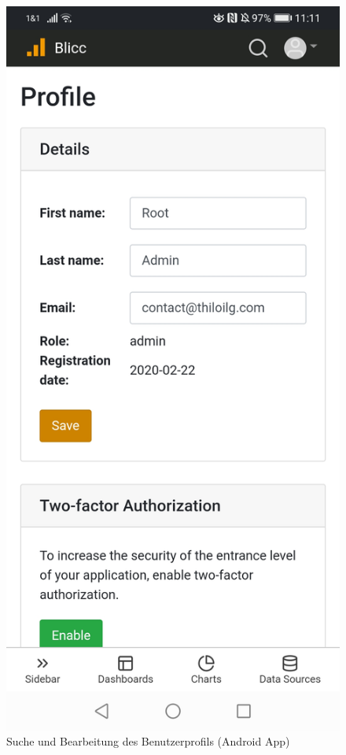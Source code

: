 \begin{figure}[h]
    \includegraphics[scale=0.1]{img/android/Profile}
    \caption{Suche und Bearbeitung des Benutzerprofils (Android App)}
    \label{figure:sucheundbearbeitungdesbenutzerprofils}
\end{figure}


